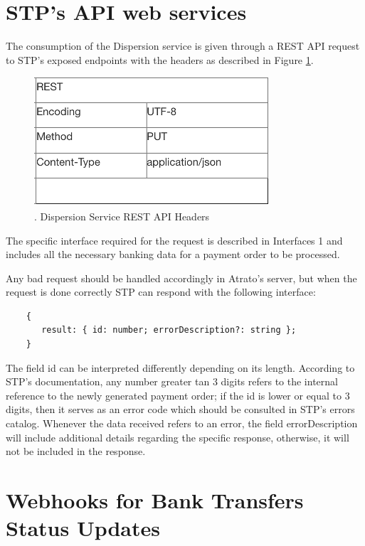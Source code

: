 \section{STP’s API web services}

The consumption of the Dispersion service is given through a REST API request to STP’s exposed endpoints with the headers as described in Figure \ref{fig:STPRequestParams}.

\begin{figure} [h!]
    \centering
    \includegraphics[scale = 1]{assets/diagrams/STPRequestParams.png}
    \caption{. Dispersion Service REST API Headers}\label{fig:STPRequestParams}
\end{figure}

The specific interface required for the request is described in Interfaces 1 and includes all the necessary banking data for a payment order to be processed.

Any bad request should be handled accordingly in Atrato’s server, but when the request is done correctly STP can respond with the following interface:

\begin{verbatim}
    {
       result: { id: number; errorDescription?: string }; 
    }
\end{verbatim}
  
The field id can be interpreted differently depending on its length. According to STP’s documentation, any number greater tan 3 digits refers to the internal reference to the newly generated payment order; if the id is lower or equal to 3 digits, then it serves as an error code which should be consulted in STP’s errors catalog. Whenever the data received refers to an error, the field errorDescription will include additional details regarding the specific response, otherwise, it will not be included in the response.

\section{Webhooks for Bank Transfers Status Updates}

